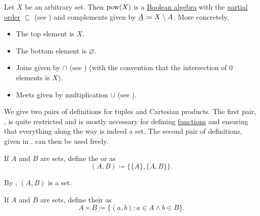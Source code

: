 \begin{proposition}\label{thm:subsets_form_boolean_algebra}
  Let \( X \) be an arbitrary set. Then \( \operatorname{pow}(X) \) is a \hyperref[def:boolean_algebra]{Boolean algebra} with the \hyperref[def:poset]{partial order} \( \subseteq \) (see ) and complements given by \( \underline{A} \coloneqq X \setminus A \). More concretely,
  \begin{itemize}
    \item The top element is \( X \).
    \item The bottom element is \( \varnothing \).
    \item Joins given by \( \cap \) (see ) (with the convention that the intersection of \( 0 \) elements is \( X \)).
    \item Meets given by multiplication \( \cup \) (see ).
  \end{itemize}
\end{proposition}

\begin{remark}\label{remark:binary_vs_arbitrary_tuples}
  We give two pairs of definitions for tuples and Cartesian products. The first pair, , is quite restricted and is mostly necessary for defining \hyperref[def:function]{functions} and ensuring that everything along the way is indeed a set. The second pair of definitions, given in , can then be used freely.
\end{remark}

\begin{definition}\label{def:kuratowski_pair}\cite[36]{Enderton1977}
  If \( A \) and \( B \) are sets, define the  or  as
  \begin{equation*}
    (A, B) \coloneqq \{ \{ A \}, \{ A, B \} \}.
  \end{equation*}

  By , \( (A, B) \) is a set.
\end{definition}

\begin{definition}\label{def:binary_cartesian_product}\cite[37]{Enderton1977}
  If \( A \) and \( B \) are sets, define their  as
  \begin{equation*}
    A \times B \coloneqq \{ (a, b) \colon a \in A \land b \in B \}.
  \end{equation*}
\end{definition}


